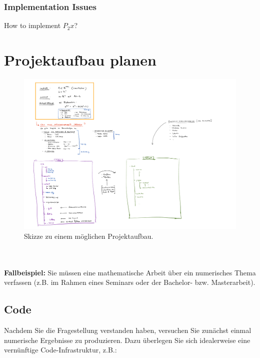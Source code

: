 \subsubsection{Implementation Issues}
How to implement $P_2 x$?


\clearpage
\section{Projektaufbau planen}
\begin{figure}[h!]
	\centering
	\includegraphics[width=1.3
	\linewidth]{./media//ProjectMindMap2}
	\caption[Mindmap zum Projektaufbau]{Skizze zu einem möglichen Projektaufbau.}
	\label{fig:projektaufbau}
\end{figure}
~\\~\\
\textbf{Fallbeispiel:} Sie müssen eine mathematische Arbeit über ein numerisches Thema verfassen (z.B. im Rahmen eines Seminars oder der Bachelor- bzw. Masterarbeit).

\subsection{Code}
Nachdem Sie die Fragestellung verstanden haben, versuchen Sie zunächst einmal numerische Ergebnisse zu produzieren. Dazu überlegen Sie sich idealerweise eine vernünftige Code-Infrastruktur, z.B.:

